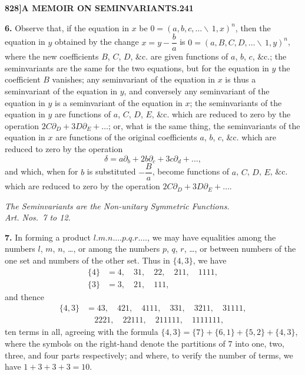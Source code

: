 \documentclass[11pt,a4paper]{book}
\begin{document}
\newpage
\setcounter{page}{241}

\noindent\textbf{828]}\hfill\textbf{A MEMOIR ON SEMINVARIANTS.}\hfill\textbf{241}

\bigskip

\noindent\textbf{6.} Observe that, if the equation in $x$ be $0 = (a, b, c, \dots \!\!\!\backslash\, 1, x)^n$, then the equation in $y$ obtained by the change $x = y - \dfrac{b}{a}$ is $0 = (a, B, C, D, \dots \!\!\!\backslash\, 1, y)^n$, where the new coefficients $B$, $C$, $D$, \&c. are given functions of $a$, $b$, $c$, \&c.; the seminvariants are the same for the two equations, but for the equation in $y$ the coefficient $B$ vanishes; any seminvariant of the equation in $x$ is thus a seminvariant of the equation in $y$, and conversely any seminvariant of the equation in $y$ is a seminvariant of the equation in $x$; the seminvariants of the equation in $y$ are functions of $a$, $C$, $D$, $E$, \&c. which are reduced to zero by the operation $2C\partial_D + 3D\partial_E + \dots$; or, what is the same thing, the seminvariants of the equation in $x$ are functions of the original coefficients $a$, $b$, $c$, \&c. which are reduced to zero by the operation
\[
\delta = a\partial_b + 2b\partial_c + 3c\partial_d + \dots,
\]
and which, when for $b$ is substituted $-\dfrac{B}{a}$, become functions of $a$, $C$, $D$, $E$, \&c. which are reduced to zero by the operation $2C\partial_D + 3D\partial_E + \dots$.

\begin{center}
\textit{The Seminvariants are the Non-unitary Symmetric Functions.}\\
\textit{Art. Nos.~7 to 12.}
\end{center}

\noindent\textbf{7.} In forming a product $l.m.n.\dots p.q.r.\dots$, we may have equalities among the numbers $l$, $m$, $n$, \dots, or among the numbers $p$, $q$, $r$, \dots, or between numbers of the one set and numbers of the other set. Thus in $\{4, 3\}$, we have
\begin{align*}
\{4\} &= 4, \quad 31, \quad 22, \quad 211, \quad 1111, \\
\{3\} &= 3, \quad 21, \quad 111,
\end{align*}
and thence
\begin{align*}
\{4, 3\} &= 43, \quad 421, \quad 4111, \quad 331, \quad 3211, \quad 31111, \\
&\quad 2221, \quad 22111, \quad 211111, \quad 1111111,
\end{align*}
ten terms in all, agreeing with the formula $\{4, 3\} = \{7\} + \{6, 1\} + \{5, 2\} + \{4, 3\}$, where the symbols on the right-hand denote the partitions of $7$ into one, two, three, and four parts respectively; and where, to verify the number of terms, we have $1 + 3 + 3 + 3 = 10$.
\end{document}
